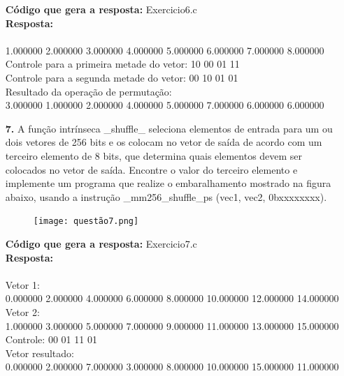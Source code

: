 \documentclass[oneside,a4paper,12pt]{article}
\renewcommand{\b}{\textbf}
\begin{document}
\begin{enumerate}
   \b{Código que gera a resposta:} Exercicio6.c\\
   \b{Resposta:}\\
   \\
   1.000000 2.000000 3.000000 4.000000 5.000000 6.000000 7.000000 8.000000\\
   Controle para a primeira metade do vetor: 10 00 01 11\\
   Controle para a segunda metade do vetor: 00 10 01 01\\
   Resultado da operação de permutação:\\
   3.000000 1.000000 2.000000 4.000000 5.000000 7.000000 6.000000 6.000000\\

   \item[\b{7.}] A função intrínseca \_shuffle\_ seleciona elementos de entrada para um ou dois vetores de 256 bits e os colocam no vetor de saída de acordo com um terceiro elemento de 8 bits, que determina quais elementos devem ser colocados no vetor de saída. Encontre o valor do terceiro elemento e implemente um programa que realize o embaralhamento mostrado na figura abaixo, usando a instrução \_mm256\_shuffle\_ps (vec1, vec2, 0bxxxxxxxx).
   
    \begin{figure}[H]
    \centering
    \texttt{[image: questão7.png]}
    \label{fig:Figura1}
    \end{figure}
   
   \b{Código que gera a resposta:} Exercicio7.c\\
   \b{Resposta:}\\
   \\
    Vetor 1:\\
    0.000000 2.000000 4.000000 6.000000 8.000000 10.000000 12.000000 14.000000\\
    Vetor 2:\\
    1.000000 3.000000 5.000000 7.000000 9.000000 11.000000 13.000000 15.000000\\
    Controle: 00 01 11 01\\
    Vetor resultado:\\
    0.000000 2.000000 7.000000 3.000000 8.000000 10.000000 15.000000 11.000000\\
   

\end{enumerate}
\end{document}
